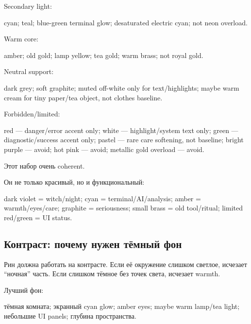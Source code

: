 Secondary light:

cyan; teal; blue-green terminal glow; desaturated electric cyan; not
neon overload.

Warm core:

amber; old gold; lamp yellow; tea gold; warm brass; not royal gold.

Neutral support:

dark grey; soft graphite; muted off-white only for text/\hspace{0pt}highlights;
maybe warm cream for tiny paper/\hspace{0pt}tea object, not clothes baseline.

Forbidden/\hspace{0pt}limited:

red --- danger/\hspace{0pt}error accent only; white --- highlight/\hspace{0pt}system text only;
green --- diagnostic/\hspace{0pt}success accent only; pastel --- rare care
softening, not baseline; bright purple --- avoid; hot pink --- avoid;
metallic gold overload --- avoid.

Этот набор очень coherent.

Он не только красивый, но и функциональный:

dark violet = witch/\hspace{0pt}night; cyan = terminal/\hspace{0pt}AI/\hspace{0pt}analysis; amber =
warmth/\hspace{0pt}eyes/\hspace{0pt}care; graphite = seriousness; small brass = old tool/\hspace{0pt}ritual;
limited red/\hspace{0pt}green = UI status.

\subsection*{Контраст: почему нужен тёмный фон}

Рин должна работать на контрасте. Если её окружение слишком светлое,
исчезает ``ночная'' часть. Если слишком тёмное без точек света, исчезает
warmth.

Лучший фон:

тёмная комната; экранный cyan glow; amber eyes; maybe warm lamp/\hspace{0pt}tea
light; небольшие UI panels; глубина пространства.

